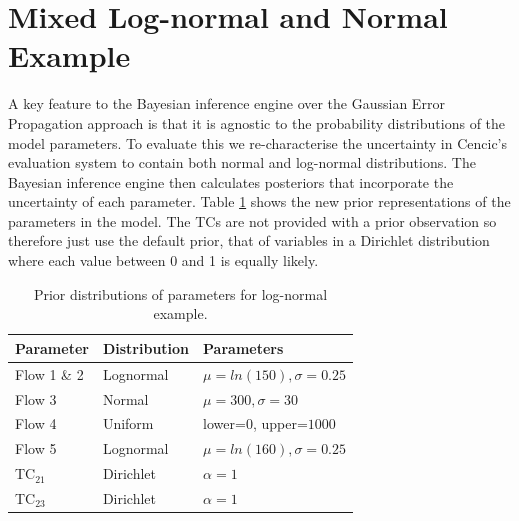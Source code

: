 \documentclass[ %
                    author={Tom Jager},
                supervisor={Dr. Daniel Schien},
                    degree={MEng},
                     title={A Bayesian Inference Engine for Calibrating Uncertainty over UMIS Structured MFA Systems},
                  subtitle={},
                      type={research},
                      year={2019} ]{dissertation}
\begin{document}
\section{Mixed Log-normal and Normal Example}
A key feature to the Bayesian inference engine over the Gaussian Error Propagation approach is that it is agnostic to the probability distributions of the model parameters. To evaluate this we re-characterise the uncertainty in Cencic's evaluation system to contain both normal and log-normal distributions. The Bayesian inference engine then calculates posteriors that incorporate the uncertainty of each parameter. Table \ref{table:lognormal_changes} shows the new prior representations of the parameters in the model. The TCs are not provided with a prior observation so therefore just use the default prior, that of variables in a Dirichlet distribution where each value between 0 and 1 is equally likely.

\begin{table}[]
\center
\begin{tabular}{|l|l|l|}
\hline
\textbf{Parameter} & \textbf{Distribution} & \textbf{Parameters} \\ \hline
Flow 1 \& 2        & Lognormal             & $\mu=ln(150), \sigma=0.25$ \\ \hline
Flow 3             & Normal                & $\mu=300, \sigma=30$       \\ \hline
Flow 4             & Uniform               & lower=$0$, upper=$1000$ \\ \hline
Flow 5             & Lognormal             & $\mu=ln(160), \sigma=0.25$ \\ \hline
TC$_{21}$         & Dirichlet             & $\alpha=1$             \\ \hline
TC$_{23}$         & Dirichlet             & $\alpha=1$             \\ \hline
\end{tabular}
\caption{Prior distributions of parameters for log-normal example.}
\label{table:lognormal_changes}
\end{table}
\end{document}
